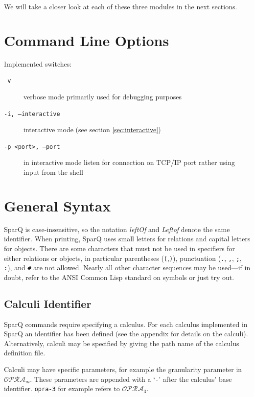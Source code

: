 \documentclass[headsepline]{scrreprt}
\theoremstyle{definition}
\newcommand{\engine}{SparQ}
\newcommand{\opra}{$\mathcal{OPRA}_m$}
\newcommand{\opradrei}{$\mathcal{OPRA}_3$}
\begin{document}
We will take a closer look at each of these three modules in the next sections.


\section{Command Line Options}\label{SEC:cmd-line-options}

Implemented switches:
\begin{description}
	\item[{\tt -v}] verbose mode primarily used for debugging purposes
	\item[{\tt -i, --interactive}] interactive mode (see section \ref{sec:interactive})
	\item[{\tt -p <port>, --port}] in interactive mode listen for connection on TCP/IP port rather using input from the shell
\end{description}


\section{General Syntax}\label{sec:syntax}

\engine{} is case-insensitive, so the notation {\em leftOf} and {\em Leftof} denote the same identifier. When printing, \engine{} uses small letters for relations and capital letters for objects.
There are some characters that must not be used in specifiers for either relations or objects, in particular parentheses ({\tt (},{\tt )}), punctuation ({\tt .}, {\tt ,}, {\tt ;}, {\tt :}), and {\tt \#} are not allowed. Nearly all other character sequences may be used---if in doubt, refer to the ANSI Common Lisp standard on symbols or just try out.


\subsection{Calculi Identifier}

\engine{} commands require specifying a calculus. For each calculus implemented in \engine{} an identifier has been defined (see the appendix for details on the calculi). Alternatively, calculi may be specified by giving the path name of the calculus definition file.

Calculi may have specific parameters, for example the granularity parameter in \opra{}. These parameters are appended with a `\verb|-|' after the calculus' base identifier. \verb|opra-3| for example refers to \opradrei{}. \pagebreak[4]
\end{document}

